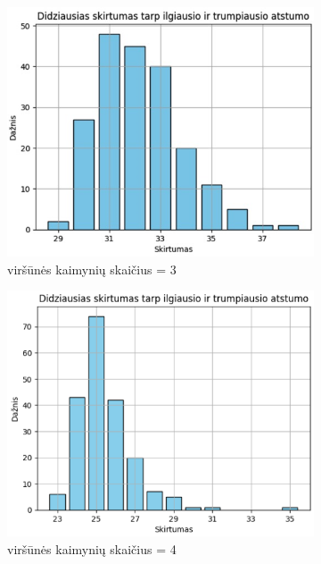 \documentclass[bibliography=totoc]{article}
\begin{document}
\begin{figure}[h]
\centering
\begin{subfigure}{.5\textwidth}
  \centering
  \includegraphics[scale = .52]{didziausias_skirtumas_k3.png}
    \caption{viršūnės kaimynių skaičius = 3}
  \label{fig:did_skirtumas_k3}
\end{subfigure}%
\begin{subfigure}{.5\textwidth}
  \centering
  \includegraphics[scale = .7]{didziausias_skirtumas_k4.png}
    \caption{viršūnės kaimynių skaičius = 4}
  \label{did_skirtumas_k4}
\end{subfigure}
\caption{}
\end{figure}
\newpage
\end{document}
